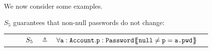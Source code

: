 We now consider some examples.

%  

{
 \begin{example}
 \label{example:twostate}
 $S_5$  guarantees   that   non-null passwords do not change:
 \\
 \begin{tabular}{lcll}
$\strut \ \ \ \ \ \ \ \ S_5$ & $\triangleq$   & ${\TwoStatesN {\prg{a}:\prg{Account}.\prg{p}:\prg{Password}}  {\prg{null}\neq \prg{p}=\prg{a.\password}}} $ %
 \end{tabular}
 \end{example} 
 }
 
